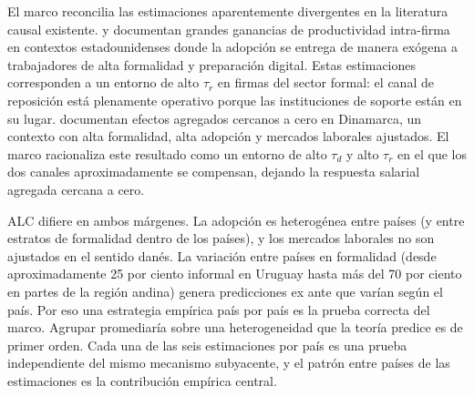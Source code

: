El marco reconcilia las estimaciones aparentemente divergentes en la literatura causal existente. \citet{Brynjolfsson2023_genai} y \citet{CuiDemirerJaffe2025_copilot} documentan grandes ganancias de productividad intra-firma en contextos estadounidenses donde la adopción se entrega de manera exógena a trabajadores de alta formalidad y preparación digital. Estas estimaciones corresponden a un entorno de alto $\tau_r$ en firmas del sector formal: el canal de reposición está plenamente operativo porque las instituciones de soporte están en su lugar. \citet{HumlumVestergaard2025_llm} documentan efectos agregados cercanos a cero en Dinamarca, un contexto con alta formalidad, alta adopción y mercados laborales ajustados. El marco racionaliza este resultado como un entorno de alto $\tau_d$ y alto $\tau_r$ en el que los dos canales aproximadamente se compensan, dejando la respuesta salarial agregada cercana a cero.

ALC difiere en ambos márgenes. La adopción es heterogénea entre países (y entre estratos de formalidad dentro de los países), y los mercados laborales no son ajustados en el sentido danés. La variación entre países en formalidad (desde aproximadamente 25 por ciento informal en Uruguay hasta más del 70 por ciento en partes de la región andina) genera predicciones ex ante que varían según el país. Por eso una estrategia empírica pa\'{i}s por pa\'{i}s es la prueba correcta del marco. Agrupar promediar\'{i}a sobre una heterogeneidad que la teoría predice es de primer orden. Cada una de las seis estimaciones por país es una prueba independiente del mismo mecanismo subyacente, y el patrón entre países de las estimaciones es la contribución empírica central.
